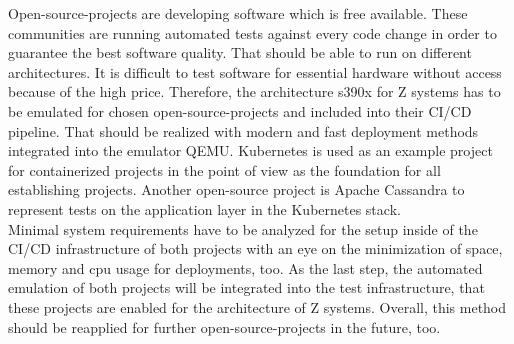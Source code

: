 Open-source-projects are developing software which is free available. These communities are running automated tests against every code change in order to guarantee the best software quality. 
That should be able to run on different architectures. It is difficult to test software for essential hardware without access because of the high price. Therefore, the architecture \gls{s390x} for \gls{Z systems} has to be emulated for chosen open-source-projects and included into their \gls{CI/CD} pipeline. That should be realized with modern and fast deployment methods integrated into the \gls{emulator} QEMU. Kubernetes is used as an example project for \gls{containerized} projects in the point of view as the foundation for all establishing projects. Another open-source project is Apache Cassandra to represent tests on the \gls{application layer} in the Kubernetes stack. \\
Minimal system requirements have to be analyzed for the setup inside of the CI/CD infrastructure of both projects with an eye on the minimization of space, memory and cpu usage for deployments, too. As the last step, the automated emulation of both projects will be integrated into the test infrastructure, that these projects are enabled for the architecture of Z systems. Overall, this method should be reapplied for further open-source-projects in the future, too.


